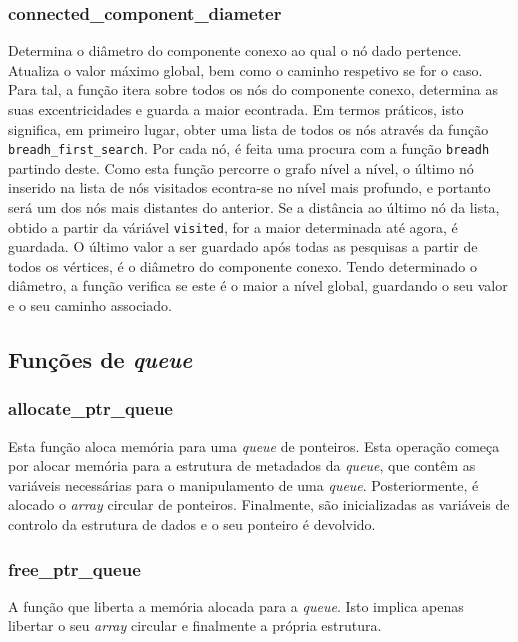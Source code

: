 \documentclass[portuguese,11pt,a4paper,titlepage]{article}
\newcommand{\foreign}[1]{\textit{#1}}
\begin{document}
\subsubsection{connected\_component\_diameter}
Determina o diâmetro do componente conexo ao qual o nó dado pertence. Atualiza o valor máximo
global, bem como o caminho respetivo se for o caso. Para tal, a função itera sobre todos
os nós do componente conexo, determina as suas excentricidades e guarda a maior econtrada.
Em termos práticos, isto significa, em primeiro lugar, obter uma lista de todos os nós através
da função \verb|breadh_first_search|. Por cada nó, é feita uma procura com a função \verb|breadh|
partindo deste. Como esta função percorre o grafo nível a nível, o último nó inserido na lista de
nós visitados econtra-se no nível mais profundo, e portanto será um dos nós mais distantes do anterior.
Se a distância ao último nó da lista, obtido a partir da váriável \verb|visited|, for a maior determinada
até agora, é guardada. O último valor a ser guardado após todas as pesquisas a partir de todos os
vértices, é o diâmetro do componente conexo. Tendo determinado o diâmetro, a função verifica se este
é o maior a nível global, guardando o seu valor e o seu caminho associado.


\subsection{Funções de \textit{queue}}
\subsubsection{allocate\_ptr\_queue}
Esta função aloca memória para uma \textit{queue} de ponteiros. Esta operação começa
por alocar memória para a estrutura de metadados da \foreign{queue}, que contêm as
variáveis necessárias para o manipulamento de uma \foreign{queue}. Posteriormente,
é alocado o \foreign{array} circular de ponteiros. Finalmente, são inicializadas
as variáveis de controlo da estrutura de dados e o seu ponteiro é devolvido.

\subsubsection{free\_ptr\_queue}
A função que liberta a memória alocada para a \foreign{queue}. Isto implica apenas
libertar o seu \foreign{array} circular e finalmente a própria estrutura.
\end{document}
